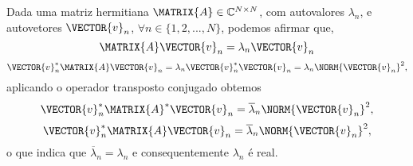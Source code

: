 \begin{myproofT}\label{proof:theo:autovalorhermitianmatrix0}
Dada uma matriz hermitiana $\MATRIX{A} \in \mathbb{C}^{N \times N}$, com  autovalores $\lambda_n$,
e autovetores $\VECTOR{v}_n$, $\forall n \in \{1, 2, ..., N\}$, podemos afirmar que,
\begin{equation}
\MATRIX{A}\VECTOR{v}_n=\lambda_n \VECTOR{v}_n
\end{equation}
\begin{equation}
\VECTOR{v}_n^{\ast}\MATRIX{A}\VECTOR{v}_n=\lambda_n \VECTOR{v}_n^{\ast} \VECTOR{v}_n=\lambda_n \NORM{\VECTOR{v}_n}^2,
\end{equation}
aplicando o operador transposto conjugado obtemos
\begin{equation}
\VECTOR{v}_n^{\ast}\MATRIX{A}^{\ast}\VECTOR{v}_n=\overline{\lambda}_n \NORM{\VECTOR{v}_n}^2,
\end{equation}
\begin{equation}
\VECTOR{v}_n^{\ast}\MATRIX{A}\VECTOR{v}_n=\overline{\lambda}_n \NORM{\VECTOR{v}_n}^2,
\end{equation}
o que indica que $\overline{\lambda}_n=\lambda_n$ e consequentemente $\lambda_n$ é real.
\end{myproofT}

